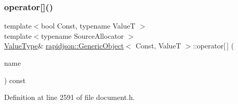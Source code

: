 \subsubsection{\texorpdfstring{operator[]()}{operator[]()}\hspace{0.1cm}{\footnotesize\ttfamily [2/2]}}
{\footnotesize\ttfamily template$<$bool Const, typename ValueT $>$ \\
template$<$typename Source\+Allocator $>$ \\
\mbox{\hyperlink{classrapidjson_1_1_generic_object_a282660500748eff5ebab93b88a9d478f}{Value\+Type}}\& \mbox{\hyperlink{classrapidjson_1_1_generic_object}{rapidjson\+::\+Generic\+Object}}$<$ Const, ValueT $>$\+::operator\mbox{[}$\,$\mbox{]} (\begin{DoxyParamCaption}\item[{\mbox{\hyperlink{classrapidjson_1_1_generic_object_a3524fcb5f36c034aabd8afa19fc16d9e}{const}} \mbox{\hyperlink{classrapidjson_1_1_generic_value}{Generic\+Value}}$<$ \mbox{\hyperlink{classrapidjson_1_1_generic_object_ac412c8d073aa02f622b3904e4195425c}{Encoding\+Type}}, Source\+Allocator $>$ \&}]{name }\end{DoxyParamCaption}) const}



Definition at line 2591 of file document.\+h.


\begin{DoxyCode}{0}

\end{DoxyCode}
\mbox{\label{classrapidjson_1_1_generic_object_a90e43c69c44aba575dd7a662155bd6d2}} 
